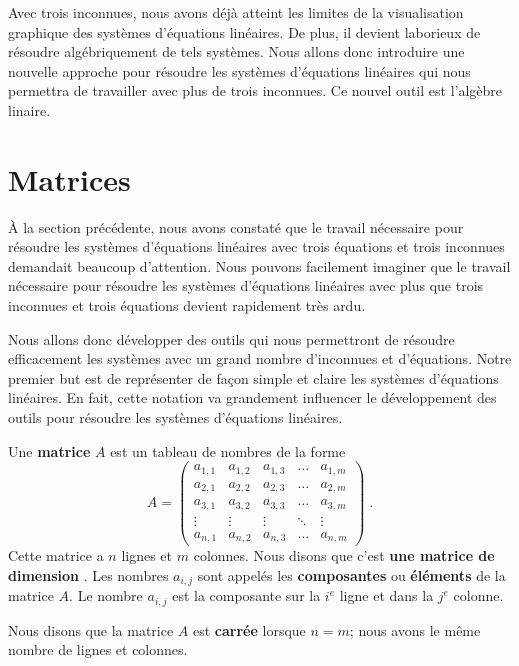 {Avec trois inconnues, nous avons déjà atteint les limites de la
visualisation graphique des systèmes d'équations linéaires.  De plus,
il devient laborieux de résoudre algébriquement de tels systèmes.  Nous
allons donc introduire une nouvelle approche pour résoudre les systèmes
d'équations linéaires qui nous permettra de travailler avec plus de
trois inconnues.  Ce nouvel outil est l'algèbre linaire.

\section{Matrices}

À la section précédente, nous avons constaté que le travail nécessaire pour
résoudre les systèmes d'équations linéaires avec trois équations et
trois inconnues demandait beaucoup d'attention.  Nous pouvons facilement
imaginer que le travail nécessaire pour résoudre les systèmes
d'équations linéaires avec plus que trois inconnues et trois équations
devient rapidement très ardu.

Nous allons donc développer des outils qui nous permettront de
résoudre efficacement les systèmes avec un grand nombre d'inconnues et
d'équations. Notre premier but est de représenter de façon simple et
claire les systèmes d'équations linéaires.  En fait, cette notation va
grandement influencer le développement des outils pour résoudre les
systèmes d'équations linéaires.

\begin{defn}
Une {\bfseries matrice} $A$ est un tableau de nombres
de la forme
\[
A =
\begin{pmatrix}
a_{1,1} & a_{1,2} & a_{1,3} & \ldots & a_{1,m} \\
a_{2,1} & a_{2,2} & a_{2,3} & \ldots & a_{2,m} \\
a_{3,1} & a_{3,2} & a_{3,3} & \ldots & a_{3,m} \\
\vdots & \vdots & \vdots & \ddots & \vdots \\
a_{n,1} & a_{n,2} & a_{n,3} & \ldots & a_{n,m}
\end{pmatrix} \; .
\]
Cette matrice a $n$ lignes et $m$ colonnes.  Nous disons que c'est
{\bfseries une matrice de dimension }.  Les nombres $a_{i,j}$
sont appelés les {\bfseries composantes} ou {\bfseries éléments} de la
matrice $A$.  Le nombre $a_{i,j}$ est la composante sur la $i^{e}$
ligne et dans la $j^{e}$ colonne.

Nous disons que la matrice $A$ est {\bfseries carrée} lorsque $n=m$;
nous avons le même nombre de lignes et colonnes.
\end{defn}

}
